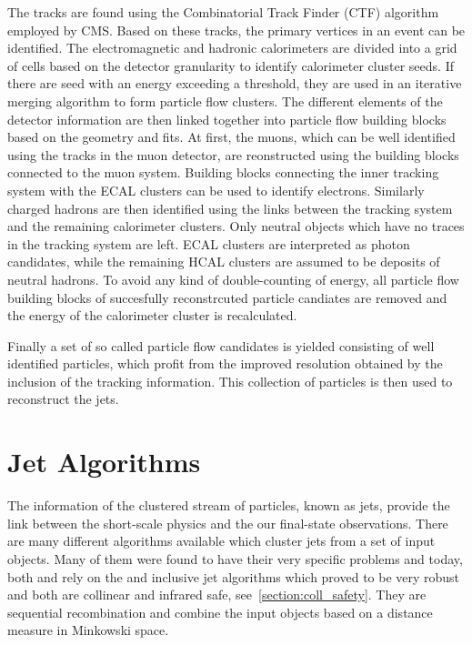 The tracks are found using the Combinatorial Track Finder (CTF)
algorithm~\cite{Adam:2005cg} employed by CMS. Based on these tracks, the primary
vertices in an event can be identified. The electromagnetic and hadronic
calorimeters are divided into a grid of cells based on the detector granularity
to identify calorimeter cluster seeds.  If there are seed with an energy
exceeding a threshold, they are used in an iterative merging algorithm to form
particle flow clusters. The different elements of the detector information are
then linked together into particle flow building blocks based on the geometry
and \chisq fits. At first, the muons, which can be well identified using the
tracks in the muon detector, are reonstructed using the building blocks
connected to the muon system. Building blocks connecting the inner tracking
system with the ECAL clusters can be used to identify electrons. Similarly
charged hadrons are then identified using the links between the tracking system
and the remaining calorimeter clusters. Only neutral objects which have no
traces in the tracking system are left. ECAL clusters are interpreted as photon
candidates, while the remaining HCAL clusters are assumed to be deposits of
neutral hadrons. To avoid any kind of double-counting of energy, all particle
flow building blocks of succesfully reconstrcuted particle candiates are removed
and the energy of the calorimeter cluster is recalculated.

Finally a set of so called particle flow candidates is yielded consisting of
well identified particles, which profit from the improved resolution obtained by
the inclusion of the tracking information. This collection of particles is then
used to reconstruct the jets.

\section{Jet Algorithms}

The information of the clustered stream of particles, known as jets, provide the
link between the short-scale physics and the our final-state observations. There
are many different algorithms available which cluster jets from a set of input
objects. Many of them were found to have their very specific problems and today,
both \CMS and \ATLAS rely on the \antikt and inclusive \kt jet algorithms which proved to be very
robust and both are collinear and infrared safe, see~\ref{section:coll_safety}.
They are sequential recombination and combine the input objects based on a
distance measure in Minkowski space. 


